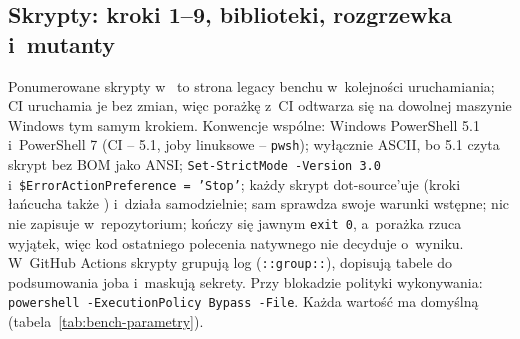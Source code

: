 
\subsection{Skrypty: kroki 1--9, biblioteki, rozgrzewka i~mutanty}\label{sec:bench-skrypty}

Ponumerowane skrypty w~ to strona legacy benchu w~kolejności uruchamiania;
CI uruchamia je bez zmian, więc porażkę z~CI odtwarza się na dowolnej maszynie Windows tym
samym krokiem. Konwencje wspólne: Windows PowerShell 5.1 i~PowerShell 7 (CI -- 5.1, joby
linuksowe -- \texttt{pwsh}); wyłącznie ASCII, bo 5.1 czyta skrypt bez BOM jako ANSI;
\texttt{Set-StrictMode -Version 3.0} i~\texttt{\$ErrorActionPreference = 'Stop'}; każdy
skrypt dot-source'uje  (kroki łańcucha także
) i~działa samodzielnie; sam sprawdza swoje warunki wstępne;
nic nie zapisuje w~repozytorium; kończy się jawnym \texttt{exit 0}, a~porażka rzuca
wyjątek, więc kod ostatniego polecenia natywnego nie decyduje o~wyniku. W~GitHub Actions
skrypty grupują log (\texttt{::group::}), dopisują tabele do podsumowania joba
i~maskują sekrety. Przy blokadzie polityki wykonywania: \texttt{powershell
-ExecutionPolicy Bypass -File}. Każda wartość ma domyślną
(tabela~\ref{tab:bench-parametry}).


